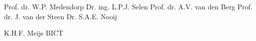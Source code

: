 \thispagestyle{empty}



\clearpage
\thispagestyle{empty}
	
\noindent {}
\noindent \npar Prof. dr. W.P. Medendorp
\npar
\noindent {}
\noindent \npar Dr. ing. L.P.J. Selen
\npar
\vspace{0.5cm}
\noindent {}
\noindent \npar Prof. dr. A.V. van den Berg
\noindent \npar Prof. dr. J. van der Steen
\noindent \npar Dr. S.A.E. Nooij


\noindent {}
\noindent \npar K.H.F. Meijs BICT
